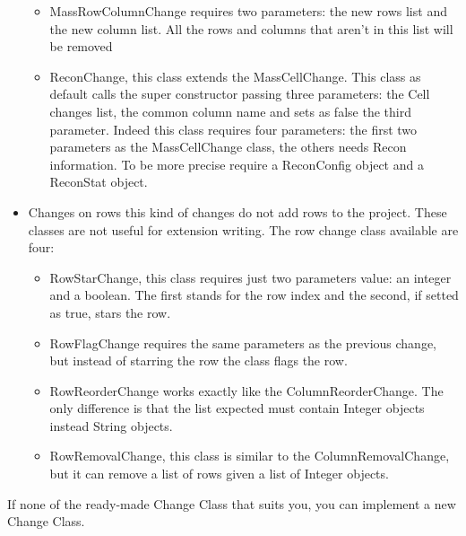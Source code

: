 \begin{itemize}
\begin{itemize}
		\item MassRowColumnChange requires two parameters: the new rows list and the new column list. All the rows and columns that aren't in this list will be removed
		\item \textsf{ReconChange}, this class extends the MassCellChange. This class as default calls the super constructor passing three parameters: the Cell changes list, the common column name and sets as false the third parameter. Indeed this class requires four parameters: the first two parameters as the MassCellChange class, the others needs Recon information. To be more precise require a ReconConfig object and a ReconStat object.
	\end{itemize}
	\item \textsf{Changes on rows} this kind of changes do not add rows to the project. These classes are not useful for extension writing. The row change class available are four: 
	\begin{itemize}
		\item RowStarChange, this class requires just two parameters value: an integer and a boolean. The first stands for the row index and the second, if setted as true, stars the row.
		\item RowFlagChange requires the same parameters as the previous change, but instead of starring the row the class flags the row.
		\item RowReorderChange works exactly like the ColumnReorderChange. The only difference is that the list expected must contain Integer objects instead String objects. 
		\item RowRemovalChange, this class is similar to the ColumnRemovalChange, but it can remove a list of rows given a list of Integer objects.
	\end{itemize}
\end{itemize}
If none of the ready-made Change Class that suits you, you can implement a new Change Class. 

